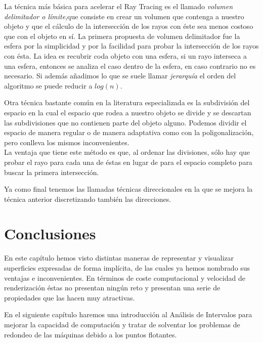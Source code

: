 La técnica más básica para acelerar el Ray Tracing es el llamado{ \em volumen delimitador o límite},que consiste en crear un volumen que contenga a nuestro objeto y que el cálculo de la intersección de los rayos con éste sea menos costoso que con el objeto en sí. La primera propuesta de volumen delimitador fue la esfera\cite{Whitted80} por la simplicidad y por la facilidad para probar la intersección de los rayos con ésta. La idea es recubrir coda objeto con una esfera, si un rayo interseca a una esfera, entonces se analiza el caso dentro de la esfera, en caso contrario no es necesario. Si además añadimos lo que se suele llamar{ \em jerarquía} el orden del algoritmo se puede reducir a $log(n)$.
\par Otra técnica bastante común en la literatura especializada es la subdivisión del espacio en la cual el espacio que rodea a nuestro objeto se divide y se descartan las subdivisiones que no contienen parte del objeto alguno. Podemos dividir el espacio de manera regular o de manera adaptativa como con la poligonalización, pero conlleva los mismos inconvenientes.\\ La ventaja que  tiene este método es que, al ordenar las divisiones, sólo hay que probar el rayo para cada una de éstas en lugar de para el espacio completo para buscar la primera intersección.
\par Ya como final tenemos las llamadas técnicas direccionales en la que se mejora la técnica anterior discretizando también las direcciones.

\section{Conclusiones}


En este capítulo hemos visto distintas maneras de representar y visualizar superficies expresadas de forma implícita, de las cuales ya hemos nombrado sus ventajas e inconvenientes. En términos de coste computacional y velocidad de renderización éstas no presentan ningún reto y presentan una serie de propiedades que las hacen muy atractivas.
\par En el siguiente capítulo haremos una introducción al Análisis de Intervalos para mejorar la capacidad de computación y tratar de solventar los problemas de redondeo de las máquinas debido a los puntos flotantes.